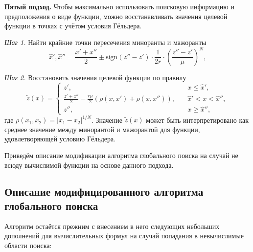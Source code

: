 \documentclass[10pt,a4paper]{book}
\begin{document}
\textbf{Пятый подход.} Чтобы максимально использовать поисковую информацию и предположения о виде функции, можно восстанавливать значения целевой функции в точках с учётом условия Гёльдера.

\textit{Шаг 1.} Найти крайние точки пересечения миноранты и мажоранты
\begin{equation}\label{eq18} 
\hat{x}',\hat{x}''=\frac {x'+x''}{2}\pm \text{sign}(z''-z')\cdot \frac {1}{2r} \cdot {\left(\frac {z''-z'}{\mu}\right)}^N,
\end{equation}

\textit{Шаг 2.} Восстановить значения целевой функции по правилу
\begin{equation}\label{eq19} 
\tilde{z}(x)=
  \begin{cases}
    z', & {\quad x \leq \hat{x}',}\\
    \frac {z'+z''}{2}- \frac {r \mu}{2} (\rho(x,x')  + \rho(x,x'')), & {\quad \hat{x}' < x < \hat{x}'',}\\
    z'',  & {\quad x \geq \hat{x}'',}
  \end{cases}
\end{equation}
где $\rho(x_1,x_2) =  |x_1 - x_2|^{1/N}$.
Значение $\tilde{z}(x)$ может быть интерпретировано как среднее значение между минорантой и мажорантой для функции, удовлетворяющей условию Гёльдера.

Приведём описание модификации алгоритма глобального поиска на случай не всюду вычислимой функции на основе данного подхода.

\subsection{Описание модифицированного алгоритма глобального поиска}
Алгоритм остаётся прежним с внесением в него следующих небольших дополнений для вычислительных формул на случай попадания в невычислимые области поиска:
\end{document}
